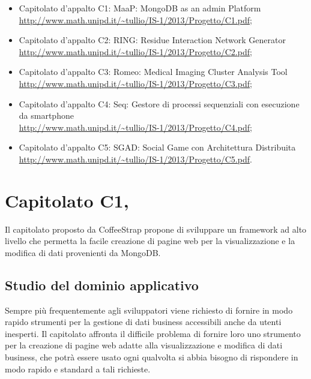 \begin{itemize}
\item Capitolato d’appalto C1: MaaP: MongoDB as an admin Platform\\
\url{http://www.math.unipd.it/~tullio/IS-1/2013/Progetto/C1.pdf};
\item Capitolato d’appalto C2: RING: Residue Interaction Network Generator\\
\url{http://www.math.unipd.it/~tullio/IS-1/2013/Progetto/C2.pdf};
\item Capitolato d’appalto C3: Romeo: Medical Imaging Cluster Analysis Tool\\
\url{http://www.math.unipd.it/~tullio/IS-1/2013/Progetto/C3.pdf};
\item Capitolato d’appalto C4: Seq: Gestore di processi sequenziali con esecuzione da smartphone\\
\url{http://www.math.unipd.it/~tullio/IS-1/2013/Progetto/C4.pdf};
\item Capitolato d’appalto C5: SGAD: Social Game con Architettura Distribuita\\
\url{http://www.math.unipd.it/~tullio/IS-1/2013/Progetto/C5.pdf}.
\end{itemize}

\newpage
\section{Capitolato C1, \Progetto{}}%
\label{2}
Il capitolato proposto da CoffeeStrap propone di sviluppare un framework ad alto livello che permetta la facile creazione di pagine web per la visualizzazione e la modifica di dati provenienti da MongoDB.
\subsection{Studio del dominio applicativo} %
\label{2.1}
Sempre più frequentemente agli sviluppatori viene richiesto di fornire in modo rapido strumenti per la gestione di dati business accessibili anche da utenti inesperti.
Il capitolato affronta il difficile problema di fornire loro uno strumento per la creazione di pagine web adatte alla visualizzazione e modifica di dati business, che potrà essere usato ogni qualvolta si abbia bisogno di rispondere in modo rapido e standard a tali richieste.
